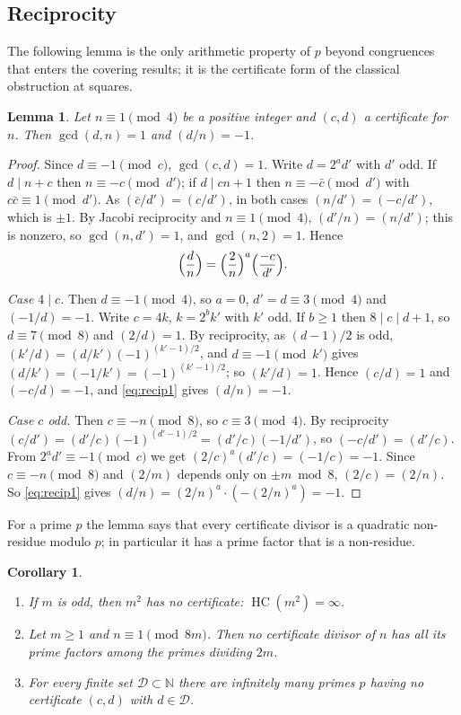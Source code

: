 \documentclass[11pt,reqno]{amsart}
\newtheorem{lemma}[theorem]{Lemma}
\newtheorem{corollary}[theorem]{Corollary}
\theoremstyle{definition}
\newcommand{\N}{\mathbb N}
\newcommand{\HC}{\operatorname{HC}}
\begin{document}
\subsection{Reciprocity}
The following lemma is the only arithmetic property of $p$ beyond
congruences that enters the covering results; it is the certificate form
of the classical obstruction at squares.

\begin{lemma}\label{lem:recip}
Let $n\equiv1\pmod4$ be a positive integer and $(c,d)$ a certificate for
$n$.  Then $\gcd(d,n)=1$ and $(d/n)=-1$.
\end{lemma}

\begin{proof}
Since $d\equiv-1\pmod c$, $\gcd(c,d)=1$.  Write $d=2^ad'$ with $d'$ odd.
If $d\mid n+c$ then $n\equiv-c\pmod{d'}$; if $d\mid cn+1$ then
$n\equiv-\bar c\pmod{d'}$ with $c\bar c\equiv1\pmod{d'}$.  As
$(\bar c/d')=(c/d')$, in both cases $(n/d')=(-c/d')$, which is $\pm1$.  By
Jacobi reciprocity and $n\equiv1\pmod4$, $(d'/n)=(n/d')$; this is nonzero,
so $\gcd(n,d')=1$, and $\gcd(n,2)=1$.  Hence
\begin{equation}\label{eq:recip1}
\Bigl(\frac dn\Bigr)=\Bigl(\frac2n\Bigr)^a\Bigl(\frac{-c}{d'}\Bigr).
\end{equation}

\emph{Case $4\mid c$.}  Then $d\equiv-1\pmod 4$, so $a=0$, $d'=d\equiv3\pmod4$
and $(-1/d)=-1$.  Write $c=4k$, $k=2^bk'$ with $k'$ odd.  If $b\ge1$ then
$8\mid c\mid d+1$, so $d\equiv7\pmod8$ and $(2/d)=1$.  By reciprocity, as
$(d-1)/2$ is odd, $(k'/d)=(d/k')(-1)^{(k'-1)/2}$, and $d\equiv-1\pmod{k'}$
gives $(d/k')=(-1/k')=(-1)^{(k'-1)/2}$; so $(k'/d)=1$.  Hence $(c/d)=1$
and $(-c/d)=-1$, and \eqref{eq:recip1} gives $(d/n)=-1$.

\emph{Case $c$ odd.}  Then $c\equiv-n\pmod 8$, so $c\equiv3\pmod 4$.  By
reciprocity $(c/d')=(d'/c)(-1)^{(d'-1)/2}=(d'/c)(-1/d')$, so
$(-c/d')=(d'/c)$.  From $2^ad'\equiv-1\pmod c$ we get
$(2/c)^a(d'/c)=(-1/c)=-1$.  Since $c\equiv-n\pmod 8$ and $(2/m)$ depends
only on $\pm m\bmod 8$, $(2/c)=(2/n)$.  So \eqref{eq:recip1} gives
$(d/n)=(2/n)^a\cdot(-(2/n)^a)=-1$.
\end{proof}

For a prime $p$ the lemma says that every certificate divisor is a
quadratic non-residue modulo $p$; in particular it has a prime factor that
is a non-residue.

\begin{corollary}\label{cor:squares}
\begin{enumerate}
\item[(a)] If $m$ is odd, then $m^2$ has no certificate: $\HC(m^2)=\infty$.
\item[(b)] Let $m\ge1$ and $n\equiv1\pmod{8m}$.  Then no certificate
divisor of $n$ has all its prime factors among the primes dividing $2m$.
\item[(c)] For every finite set $\mathcal D\subset\N$ there are infinitely
many primes $p$ having no certificate $(c,d)$ with $d\in\mathcal D$.
\end{enumerate}
\end{corollary}
\end{document}
